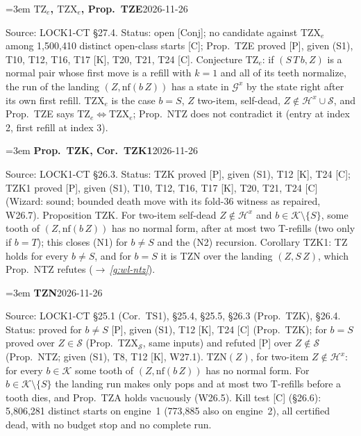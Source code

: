 \documentclass[11pt]{amsart}
\makeatletter
\newcommand{\nf}{\mathrm{nf}}
\newcommand{\Hc}{\mathcal H}
\newcommand{\Gc}{\mathcal G}
\newcommand{\Kc}{\mathcal K}
\newcounter{sense}
\newenvironment{entry}[3]{%
  \par\addvspace{\medskipamount}\noindent\phantomsection
  \def\@currentlabel{#2}\label{#1}\setcounter{sense}{0}\raggedright\emergencystretch=3em%
  \textbf{#2}\hfill{\footnotesize\textsf{#3}}\par\nopagebreak\noindent\ignorespaces}%
  {\par}
\newcommand{\src}[1]{\textsf{Source:} #1.\enskip}
\newcommand{\status}[1]{\textsf{Status:} #1.\enskip}
\renewcommand{\see}[1]{$\rightarrow$\,\emph{\ref{#1}}}
\makeatother
\begin{document}
\begin{entry}{g:wl-tze}{$\mathrm{TZ}_e$, $\mathrm{TZX}_e$, Prop.~TZE}{2026-11-26}
\src{LOCK1-CT \S27.4}
\status{open [Conj]; no candidate against $\mathrm{TZX}_e$ among 1,500,410 distinct open-class starts
[C]; Prop.~TZE proved [P], given (S1), T10, T12, T16, T17 [K], T20, T21, T24 [C]}
Conjecture $\mathrm{TZ}_e$: if $(S\,T\,b,Z)$ is a normal pair whose first move is a refill with $k=1$
and all of its teeth normalize, the run of the landing $(Z,\nf(b\,Z))$ has a state in $\Gc^{x}$ by the
state right after its own first refill. $\mathrm{TZX}_e$ is the case $b=S$, $Z$ two-item, self-dead,
$Z\notin\Hc^{x}\cup\mathcal S$, and Prop.~TZE says $\mathrm{TZ}_e\Leftrightarrow\mathrm{TZX}_e$; Prop.~NTZ
does not contradict it (entry at index 2, first refill at index 3).
\end{entry}

\begin{entry}{g:wl-tzk}{Prop.~TZK, Cor.~TZK1}{2026-11-26}
\src{LOCK1-CT \S26.3}
\status{TZK proved [P], given (S1), T12 [K], T24 [C]; TZK1 proved [P], given (S1), T10, T12, T16,
T17 [K], T20, T21, T24 [C] (Wizard: sound; bounded death move with its fold-36 witness as repaired,
W26.7)}
Proposition TZK. For two-item self-dead $Z\notin\Hc^{x}$ and $b\in\Kc\setminus\{S\}$, some tooth of
$(Z,\nf(b\,Z))$ has no normal form, after at most two T-refills (two only if $b=T$); this closes (N1)
for $b\ne S$ and the (N2) recursion. Corollary TZK1: TZ holds for every $b\ne S$, and for $b=S$ it is
TZN over the landing $(Z,S\,Z)$, which Prop.~NTZ refutes (\see{g:wl-ntz}).
\end{entry}

\begin{entry}{g:wl-tzn}{TZN}{2026-11-26}
\src{LOCK1-CT \S25.1 (Cor.~TS1), \S25.4, \S25.5, \S26.3 (Prop.~TZK), \S26.4}
\status{proved for $b\ne S$ [P], given (S1), T12 [K], T24 [C] (Prop.~TZK); for $b=S$ proved over
$Z\in\mathcal S$ (Prop.~TZX$_{\mathcal S}$, same inputs) and refuted [P] over $Z\notin\mathcal S$
(Prop.~NTZ; given (S1), T8, T12 [K], W27.1)}
$\mathrm{TZN}(Z)$, for two-item $Z\notin\Hc^{x}$: for every $b\in\Kc$ some tooth of $(Z,\nf(b\,Z))$
has no normal form. For $b\in\Kc\setminus\{S\}$ the landing run makes only pops and at most two
T-refills before a tooth dies, and Prop.~TZA holds vacuously (W26.5). Kill test [C] (\S26.6): 5,806,281
distinct starts on engine~1 (773,885 also on engine~2), all certified dead, with no budget stop and no
complete run.
\end{entry}
\end{document}

